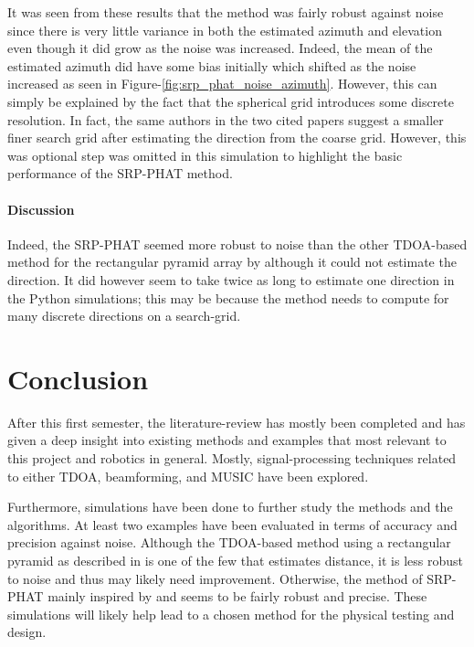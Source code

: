 \documentclass[notitlepage]{report}
\begin{document}
It was seen from these results that the method was fairly robust against noise since there is very little variance in both the estimated azimuth and elevation even though it did grow as the noise was increased. Indeed, the mean of the estimated azimuth did have some bias initially which shifted as the noise increased as seen in Figure-\ref{fig:srp_phat_noise_azimuth}. However, this can simply be explained by the fact that the spherical grid introduces some discrete resolution. In fact, the same authors in the two cited papers \cite{valin_localization_2004} \cite{valin_robust_2007} suggest a smaller finer search grid after estimating the direction from the coarse grid. However, this was optional step was omitted in this simulation to highlight the basic performance of the SRP-PHAT method.

\subsubsection{Discussion}

Indeed, the SRP-PHAT seemed more robust to noise than the other TDOA-based method for the rectangular pyramid array by \cite{chen_sound_2019} although it could not estimate the direction. It did however seem to take twice as long to estimate one direction in the Python simulations; this may be because the method needs to compute for many discrete directions on a search-grid.

\chapter{Conclusion}

After this first semester, the literature-review has mostly been completed and has given a deep insight into existing methods and examples that most relevant to this project and robotics in general. Mostly, signal-processing techniques related to either TDOA, beamforming, and MUSIC have been explored.

Furthermore, simulations have been done to further study the methods and the algorithms. At least two examples have been evaluated in terms of accuracy and precision against noise. Although the TDOA-based method using a rectangular pyramid as described in \cite{chen_sound_2019} is one of the few that estimates distance, it is less robust to noise and thus may likely need improvement. Otherwise, the method of SRP-PHAT mainly inspired by \cite{valin_localization_2004} and \cite{valin_robust_2007} seems to be fairly robust and precise. These simulations will likely help lead to a chosen method for the physical testing and design.
\end{document}
